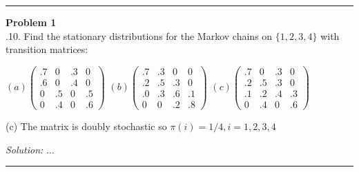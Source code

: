\documentclass[a4paper, 11pt]{article}
\newenvironment{problem}[2][Problem]
    { \begin{mdframed}[backgroundcolor=gray!20] \textbf{#1 #2} \\}
    {  \end{mdframed}}
\newenvironment{solution}
    {\textit{Solution:}}
    {}
\begin{document}
\noindent\rule{7in}{2.8pt}
\begin{problem}{1.10}
	1.10. Find the stationary distributions for the Markov chains on $\{1,2,3,4\}$ with transition matrices:
	
	$(a)\left(\begin{array}{cccc}.7 & 0 & .3 & 0 \\ .6 & 0 & .4 & 0 \\ 0 & .5 & 0 & .5 \\ 0 & .4 & 0 & .6\end{array}\right)$
	$(b)\left(\begin{array}{cccc}.7 & .3 & 0 & 0 \\ .2 & .5 & .3 & 0 \\ .0 & .3 & .6 & .1 \\ 0 & 0 & .2 & .8\end{array}\right)$
	$(c)\left(\begin{array}{cccc}.7 & 0 & .3 & 0 \\ .2 & .5 & .3 & 0 \\ .1 & .2 & .4 & .3 \\ 0 & .4 & 0 & .6\end{array}\right)$
	
	(c) The matrix is doubly stochastic so $\pi(i)=1 / 4, i=1,2,3,4$
\end{problem}
\begin{solution}
	...
\end{solution}

\noindent\rule{7in}{2.8pt}
\end{document}
